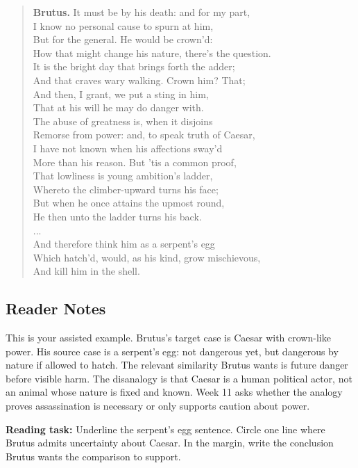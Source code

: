 \documentclass[12pt]{article}
\newenvironment{playpassage}{\begin{quote}\footnotesize\setlength{\parskip}{0.08em}\setlength{\parindent}{0pt}}{\end{quote}}
\newcommand{\speaker}[1]{\textbf{#1.}}
\begin{document}
\begin{playpassage}
\speaker{Brutus} It must be by his death: and for my part,\\
I know no personal cause to spurn at him,\\
But for the general. He would be crown'd:\\
How that might change his nature, there's the question.\\
It is the bright day that brings forth the adder;\\
And that craves wary walking. Crown him? That;\\
And then, I grant, we put a sting in him,\\
That at his will he may do danger with.\\
The abuse of greatness is, when it disjoins\\
Remorse from power: and, to speak truth of Caesar,\\
I have not known when his affections sway'd\\
More than his reason. But 'tis a common proof,\\
That lowliness is young ambition's ladder,\\
Whereto the climber-upward turns his face;\\
But when he once attains the upmost round,\\
He then unto the ladder turns his back.\\
...\\
And therefore think him as a serpent's egg\\
Which hatch'd, would, as his kind, grow mischievous,\\
And kill him in the shell.
\end{playpassage}

\subsection*{Reader Notes}

This is your assisted example. Brutus's target case is Caesar with crown-like power. His source case is a serpent's egg: not dangerous yet, but dangerous by nature if allowed to hatch. The relevant similarity Brutus wants is future danger before visible harm. The disanalogy is that Caesar is a human political actor, not an animal whose nature is fixed and known. Week 11 asks whether the analogy proves assassination is necessary or only supports caution about power.

\textbf{Reading task:} Underline the serpent's egg sentence. Circle one line where Brutus admits uncertainty about Caesar. In the margin, write the conclusion Brutus wants the comparison to support.
\end{document}
